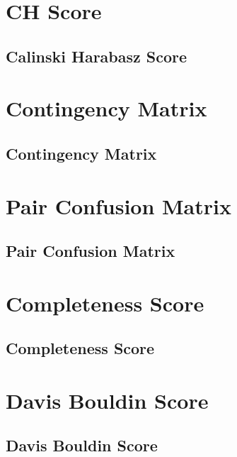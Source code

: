 \clearpage
\thispagestyle{clusteringstyle}
\section{CH Score}
\subsection{Calinski Harabasz Score}


\clearpage
\thispagestyle{clusteringstyle}
\section{Contingency Matrix}
\subsection{Contingency Matrix}

\clearpage
\thispagestyle{clusteringstyle}
\section{Pair Confusion Matrix}
\subsection{Pair Confusion Matrix}

\clearpage
\thispagestyle{clusteringstyle}
\section{Completeness Score}
\subsection{Completeness Score}

\clearpage
\thispagestyle{clusteringstyle}
\section{Davis Bouldin Score}
\subsection{Davis Bouldin Score}

\clearpage
\thispagestyle{clusteringstyle}
